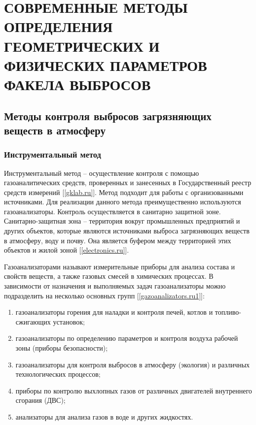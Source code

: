 \documentclass[14pt, a4paper]{extreport}
\begin{document}
\chapter [\vspace*{-0.22cm}СОВРЕМЕННЫЕ МЕТОДЫ ОПРЕДЕЛЕНИЯ ГЕОМЕТРИЧЕСКИХ \hspace*{-0.5cm} И ФИЗИЧЕСКИХ ПАРАМЕТРОВ ФАКЕЛА ВЫБРОСОВ]{\vspace*{-0.22cm}СОВРЕМЕННЫЕ МЕТОДЫ ОПРЕДЕЛЕНИЯ ГЕОМЕТРИЧЕСКИХ И ФИЗИЧЕСКИХ ПАРАМЕТРОВ ФАКЕЛА ВЫБРОСОВ}
\section {Методы контроля выбросов загрязняющих веществ в атмосферу}
\subsection {Инструментальный метод}
	Инструментальный метод -- осуществление контроля с помощью газоаналитических средств, проверенных и занесенных в Государственный реестр средств измерений [\ref{gklab.ru}]. Метод подходит для работы с организованными источниками. Для реализации данного метода преимущественно используются газоанализаторы. Контроль осуществляется в санитарно защитной зоне. Санитарно-защитная зона -- территория вокруг промышленных предприятий и других объектов, которые являются источниками выброса загрязняющих веществ в атмосферу, воду и почву. Она является буфером между территорией этих объектов и жилой зоной [\ref{electronics.ru}].
	
	Газоанализаторами называют измерительные приборы для анализа состава и свойств веществ, а также газовых смесей в химических процессах. В зависимости от назначения и выполняемых задач газоанализаторы можно подразделить на несколько основных групп [\ref{gazoanalizators.ru1}]:
	\begin{enumerate}[label={\arabic*)}]
		\item газоанализаторы горения для наладки и контроля печей, котлов и топливо-сжигающих установок;
		\item газоанализаторы по определению параметров и контроля воздуха рабочей зоны (приборы безопасности);
		\item газоанализаторы для контроля выбросов в атмосферу (экология) и различных технологических процессов;
		\item приборы по контролю выхлопных газов от различных двигателей внутреннего сгорания (ДВС);
		\item анализаторы для анализа газов в воде и других жидкостях.
	\end{enumerate}	
		
\end{document}

